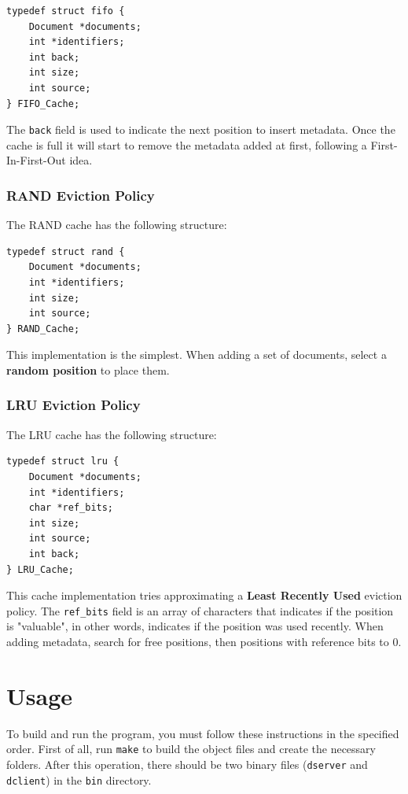 \documentclass[a4paper, 11pt]{article}
\begin{document}
\begin{Verbatim}[xleftmargin=2em]
typedef struct fifo {
    Document *documents;
    int *identifiers;
    int back;
    int size;
    int source;
} FIFO_Cache;
\end{Verbatim}

\noindent The \texttt{back} field is used to indicate the next position to insert metadata. Once the cache is full it will start to remove the metadata added at first, following a First-In-First-Out idea.

\subsubsection{RAND Eviction Policy}

The RAND cache has the following structure:

\begin{Verbatim}[xleftmargin=2em]
typedef struct rand {
    Document *documents;
    int *identifiers;
    int size;
    int source;
} RAND_Cache;
\end{Verbatim}

\noindent This implementation is the simplest. When adding a set of documents, select a \textbf{random position} to place them.

\subsubsection{LRU Eviction Policy}

The LRU cache has the following structure:

\begin{Verbatim}[xleftmargin=2em]
typedef struct lru {
    Document *documents;
    int *identifiers;
    char *ref_bits;
    int size;
    int source;
    int back;
} LRU_Cache;
\end{Verbatim}

\noindent This cache implementation tries approximating a \textbf{Least Recently Used} eviction policy. The \texttt{ref\_bits} field is an array of characters that indicates if the position is "valuable", in other words, indicates if the position was used recently. When adding metadata, search for free positions, then positions with reference bits to 0.


\section{Usage}

To build and run the program, you must follow these instructions in the specified order. First of all, run \texttt{make} to build the object files and create the necessary folders. After this operation, there should be two binary files (\texttt{dserver} and \texttt{dclient}) in the \texttt{bin} directory.
\end{document}

